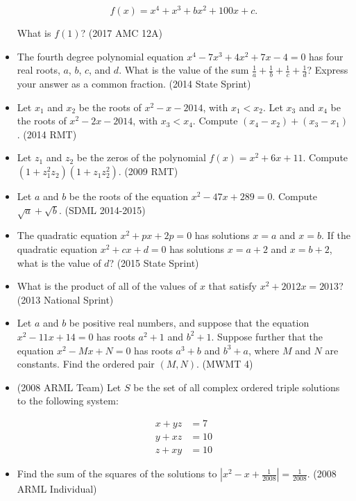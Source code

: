 \documentclass{article}
\begin{document}
\begin{itemize}
$$f(x) = x^4 + x^3 + bx^2 + 100x + c.$$

What is $f(1)$? (2017 AMC 12A)

\item The fourth degree polynomial equation $x^4-7x^3+4x^2+7x-4=0$ has four real roots, $a$, $b$, $c$, and $d$. What is the value of the sum $\frac{1}{a}+\frac{1}{b}+\frac{1}{c}+\frac{1}{d}$? Express your answer as a common fraction. (2014 State Sprint)

\item Let $x_1$ and $x_2$ be the roots of $x^2 - x - 2014$, with $x_1 < x_2$. Let $x_3$ and $x_4$ be the roots of $x^2 - 2x - 2014$, with $x_3 < x_4$. Compute $(x_4 - x_2) + (x_3 - x_1)$. (2014 RMT)

\item Let $z_1$ and $z_2$ be the zeros of the polynomial $f(x)=x^2+6x+11$. Compute $(1+z_1^2z_2)(1+z_1z_2^2)$. (2009 RMT)

\item Let $a$ and $b$ be the roots of the equation $x^2-47x+289=0$. Compute $\sqrt{a}+\sqrt{b}$. (SDML 2014-2015)

\item The quadratic equation $x^2+px+2p=0$ has solutions $x=a$ and $x=b$. If the quadratic equation $x^2+cx+d=0$ has solutions $x=a+2$ and $x=b+2$, what is the value of $d$? (2015 State Sprint)

\item What is the product of all of the values of $x$ that satisfy $x^2+2012x=2013$? (2013 National Sprint)

\item Let $a$ and $b$ be positive real numbers, and suppose that the equation $x^2-11x+14=0$ has roots $a^2+1$ and $b^2+1$. Suppose further that the equation $x^2-Mx+N=0$ has roots $a^3+b$ and $b^3+a$, where $M$ and $N$ are constants. Find the ordered pair $(M,N)$. (MWMT 4)

\item (2008 ARML Team) Let $S$ be the set of all complex ordered triple solutions to the following system:

\begin{align*}
x+yz &= 7\\
y+xz &= 10 \\
z+xy &= 10 
\end{align*}

\item Find the sum of the squares of the solutions to $|x^2-x+\frac{1}{2008}|=\frac{1}{2008}$. (2008 ARML Individual)


\end{itemize}
\end{document}
